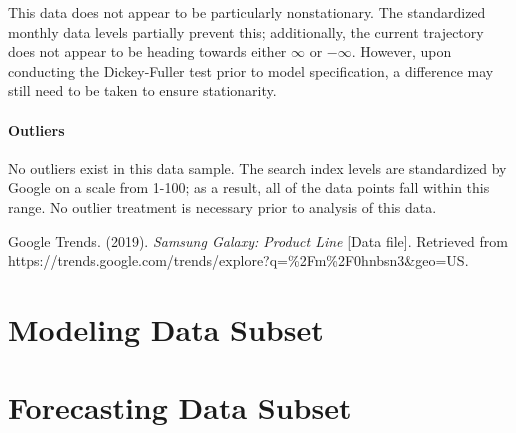 \documentclass[12pt]{article}
\begin{document}
	This data does not appear to be particularly nonstationary.  The standardized monthly data levels partially prevent this; additionally, the current trajectory does not appear to be heading towards either $ \infty $ or $ -\infty $.  However, upon conducting the Dickey-Fuller test prior to model specification, a difference may still need to be taken to ensure stationarity.
	

\paragraph{Outliers}

	No outliers exist in this data sample.  The search index levels are standardized by Google on a scale from 1-100; as a result, all of the data points fall within this range.  No outlier treatment is necessary prior to analysis of this data.

\newpage
\begin{thebibliography}{1}
	
		
	Google Trends. (2019). \textit{Samsung Galaxy: Product Line} [Data file]. Retrieved from https://trends.google.com/trends/explore?q=\%2Fm\%2F0hnbsn3\&geo=US.
	
	
	
\end{thebibliography}

\newpage
\begin{appendices}	
	\section{Modeling Data Subset}
	
\newpage

	\section{Forecasting Data Subset}

\end{appendices}
\end{document}
